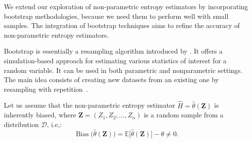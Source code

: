 We extend our exploration of non-parametric entropy estimators by incorporating  bootstrap methodologies, because we need them to perform well with small samples. 
The integration of bootstrap techniques aims to refine the accuracy of non-parametric entropy estimators.

Bootstrap is essentially a resampling algorithm introduced by \citep{Efron1979}. 
It offers a simulation-based approach for estimating various statistics of interest for a random variable.
It can be used in both parametric and nonparametric settings. 
The main idea  consists of creating new datasets from an existing one by resampling with repetition~\citep{Michelucci2021}.

Let us assume that the non-parametric entropy estimator
\(\widehat{H}=\widehat{\theta}(\bm{Z})\) is inherently biased, where \(\bm{Z}=(Z_1, Z_2,\ldots,Z_n)\) is a random sample from a
distribution \(\mathcal{D}\), i.e,:\begin{equation}
\label{Eq:bias1}
\operatorname{Bias}\big(\widehat{\theta}(\bm{Z})\big) = \mathbb{E}\big[\widehat{\theta}(\bm{Z})\big] - \theta \neq 0.
\end{equation} 

